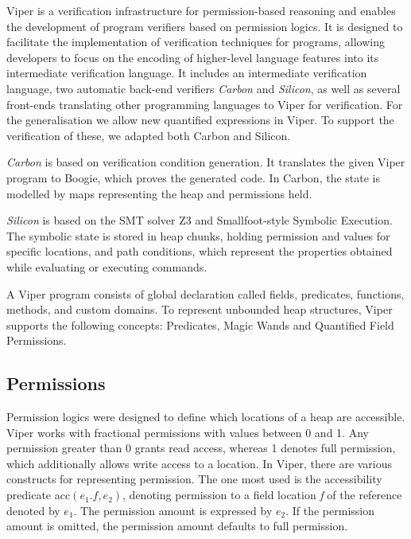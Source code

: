 \documentclass[12pt]{article}
\begin{document}
Viper is a verification infrastructure for permission-based reasoning and enables the development of program verifiers based on permission logics. It is designed to facilitate the implementation of verification techniques for programs, allowing developers to focus on the encoding of higher-level language features into its intermediate verification language. It includes an intermediate verification language, two automatic back-end verifiers \textit{Carbon} and \textit{Silicon}, as well as several front-ends translating other programming languages to Viper for verification. For the generalisation we allow new quantified expressions in Viper. To support the verification of these, we adapted both Carbon and Silicon. 

\textit{Carbon}  is based on verification condition generation. It translates the given Viper program to Boogie\cite{leino2008boogie}, which proves the generated code.
In Carbon, the state is modelled by maps representing the heap and permissions held.

\textit{Silicon} is based on the SMT solver Z3\cite{de2008z3} and Smallfoot-style Symbolic Execution\cite{berdine2005smallfoot}. The symbolic state is stored in heap chunks, holding permission and values for specific locations, and path conditions, which represent the properties obtained while evaluating or executing commands.

A Viper program consists of global declaration called fields, predicates, functions, methods, and custom domains. To represent unbounded heap structures, Viper supports the following concepts: Predicates, Magic Wands and Quantified Field Permissions.

\subsection{Permissions}
Permission logics were designed to define which locations of a heap are accessible. Viper works with fractional permissions with values between 0 and 1. Any permission greater than 0 grants read access, whereas 1 denotes full permission, which additionally allows write access to a location. 
In Viper, there are various constructs for representing permission. The one most used is the accessibility predicate acc\((e_1.f, e_2)\), denoting permission to a field location \textit{f} of the reference denoted by \(e_1\). The permission amount is expressed by \(e_2\). If the permission amount is omitted, the permission amount defaults to full permission.
\end{document}
